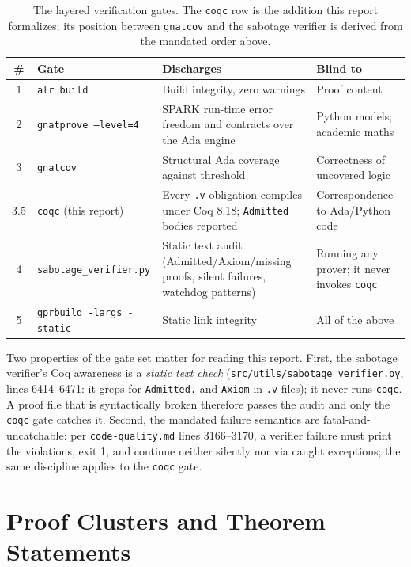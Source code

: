 \documentclass[11pt]{article}
\theoremstyle{definition}
\begin{document}
\begin{table}[h]
\centering
\caption{The layered verification gates. The \texttt{coqc} row is the
addition this report formalizes; its position between \texttt{gnatcov} and
the sabotage verifier is derived from the mandated order above.}
\label{tab:gates}
\begin{tabular}{@{}clp{4.6cm}p{4.2cm}@{}}
\toprule
\textbf{\#} & \textbf{Gate} & \textbf{Discharges} & \textbf{Blind to} \\
\midrule
1 & \texttt{alr build} & Build integrity, zero warnings & Proof content \\
2 & \texttt{gnatprove --level=4} & SPARK run-time error freedom and contracts over the Ada engine & Python models; academic maths \\
3 & \texttt{gnatcov} & Structural Ada coverage against threshold & Correctness of uncovered logic \\
3.5 & \texttt{coqc} (this report) & Every \texttt{.v} obligation compiles under Coq 8.18; \texttt{Admitted} bodies reported & Correspondence to Ada/Python code \\
4 & \texttt{sabotage\_verifier.py} & Static text audit (Admitted/Axiom/missing proofs, silent failures, watchdog patterns) & Running any prover; it never invokes \texttt{coqc} \\
5 & \texttt{gprbuild -largs -static} & Static link integrity & All of the above \\
\bottomrule
\end{tabular}
\end{table}

Two properties of the gate set matter for reading this report. First, the
sabotage verifier's Coq awareness is a \emph{static text check}
(\texttt{src/utils/sabotage\_verifier.py}, lines 6414--6471: it greps for
\texttt{Admitted.} and \texttt{Axiom} in \texttt{.v} files); it never runs
\texttt{coqc}. A proof file that is syntactically broken therefore passes
the audit and only the \texttt{coqc} gate catches it. Second, the mandated
failure semantics are fatal-and-uncatchable: per \texttt{code-quality.md}
lines 3166--3170, a verifier failure must print the violations, exit 1, and
continue neither silently nor via caught exceptions; the same discipline
applies to the \texttt{coqc} gate.

\section{Proof Clusters and Theorem Statements}\label{sec:clusters}
\end{document}
